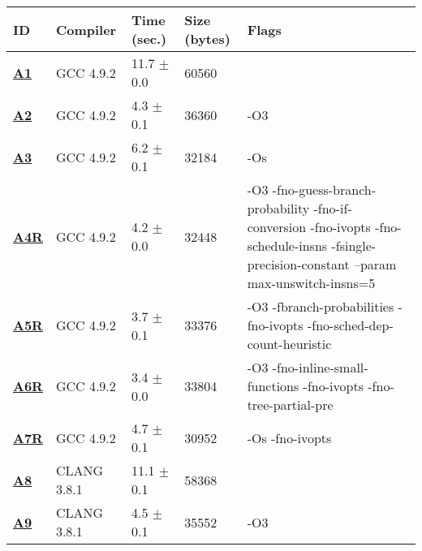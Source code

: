     \begin{tabular}{|l|l|l|l|p{3.2in}|}
     \hline
      \textbf{ID} & \textbf{Compiler} & \textbf{Time (sec.)} & \textbf{Size (bytes)} & \textbf{Flags} \\ 
     \hline
      \textbf{ \href{http://cknowledge.org/repo/web.php?wcid=experiment:f9e6ec8d198c36c3\&subpoint=7cf654adb86fb606}{A1} } &  GCC 4.9.2  &  11.7 $\pm$ 0.0  &  60560  & {\small  }\\
     \hline
      \textbf{ \href{http://cknowledge.org/repo/web.php?wcid=experiment:0b867dd820354a8b\&subpoint=5734f47e4214a783}{A2} } &  GCC 4.9.2  &  4.3 $\pm$ 0.1  &  36360  & {\small -O3 }\\
     \hline
      \textbf{ \href{http://cknowledge.org/repo/web.php?wcid=experiment:b2b26ab783304fc4\&subpoint=7d87c22a2425da10}{A3} } &  GCC 4.9.2  &  6.2 $\pm$ 0.1  &  32184  & {\small -Os }\\
     \hline
      \textbf{ \href{http://cknowledge.org/repo/web.php?wcid=experiment:98688a71f99ac30b\&subpoint=4bcd9dad6b249a79}{A4R} } &  GCC 4.9.2  &  4.2 $\pm$ 0.0  &  32448  & {\small -O3 -fno-guess-branch-probability -fno-if-conversion -fno-ivopts -fno-schedule-insns -fsingle-precision-constant --param max-unswitch-insns=5 }\\
     \hline
      \textbf{ \href{http://cknowledge.org/repo/web.php?wcid=experiment:984b2d8abc3c4415\&subpoint=78c281b4cab897a6}{A5R} } &  GCC 4.9.2  &  3.7 $\pm$ 0.1  &  33376  & {\small -O3 -fbranch-probabilities -fno-ivopts -fno-sched-dep-count-heuristic }\\
     \hline
      \textbf{ \href{http://cknowledge.org/repo/web.php?wcid=experiment:7af17ca204080b57\&subpoint=5a464ecf81b60098}{A6R} } &  GCC 4.9.2  &  3.4 $\pm$ 0.0  &  33804  & {\small -O3 -fno-inline-small-functions -fno-ivopts -fno-tree-partial-pre }\\
     \hline
      \textbf{ \href{http://cknowledge.org/repo/web.php?wcid=experiment:992855e25efa2c4a\&subpoint=c6b45e2c3e414452}{A7R} } &  GCC 4.9.2  &  4.7 $\pm$ 0.1  &  30952  & {\small -Os -fno-ivopts }\\
     \hline
      \textbf{ \href{http://cknowledge.org/repo/web.php?wcid=experiment:a32e34c31b900930\&subpoint=64ec888d2e6a0669}{A8} } &  CLANG 3.8.1  &  11.1 $\pm$ 0.1  &  58368  & {\small  }\\
     \hline
      \textbf{ \href{http://cknowledge.org/repo/web.php?wcid=experiment:99141b3313132494\&subpoint=a63f42ac837e38d0}{A9} } &  CLANG 3.8.1  &  4.5 $\pm$ 0.1  &  35552  & {\small -O3 }\\
     \hline
    \end{tabular}    